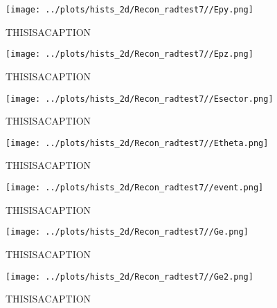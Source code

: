 \documentclass{article}
\begin{document}
\begin{landscape}
    \begin{figure}[ht]
        \centering

        \texttt{[image: ../plots/hists\_2d/Recon\_radtest7//Epy.png]}
        \captionsetup{textformat=empty,labelformat=blank}
        \caption{THISISACAPTION}
    \end{figure}
    \clearpage
    
    \begin{figure}[ht]
        \centering

        \texttt{[image: ../plots/hists\_2d/Recon\_radtest7//Epz.png]}
        \captionsetup{textformat=empty,labelformat=blank}
        \caption{THISISACAPTION}
    \end{figure}
    \clearpage
    
    \begin{figure}[ht]
        \centering

        \texttt{[image: ../plots/hists\_2d/Recon\_radtest7//Esector.png]}
        \captionsetup{textformat=empty,labelformat=blank}
        \caption{THISISACAPTION}
    \end{figure}
    \clearpage
    
    \begin{figure}[ht]
        \centering

        \texttt{[image: ../plots/hists\_2d/Recon\_radtest7//Etheta.png]}
        \captionsetup{textformat=empty,labelformat=blank}
        \caption{THISISACAPTION}
    \end{figure}
    \clearpage
    
    \begin{figure}[ht]
        \centering

        \texttt{[image: ../plots/hists\_2d/Recon\_radtest7//event.png]}
        \captionsetup{textformat=empty,labelformat=blank}
        \caption{THISISACAPTION}
    \end{figure}
    \clearpage
    
    \begin{figure}[ht]
        \centering

        \texttt{[image: ../plots/hists\_2d/Recon\_radtest7//Ge.png]}
        \captionsetup{textformat=empty,labelformat=blank}
        \caption{THISISACAPTION}
    \end{figure}
    \clearpage
    
    \begin{figure}[ht]
        \centering

        \texttt{[image: ../plots/hists\_2d/Recon\_radtest7//Ge2.png]}
        \captionsetup{textformat=empty,labelformat=blank}
        \caption{THISISACAPTION}
    \end{figure}
    \clearpage
    

\end{landscape}
\end{document}
